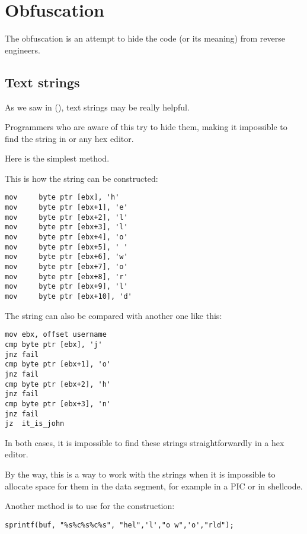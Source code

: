 \section{Obfuscation}

The obfuscation is an attempt to hide the code (or its meaning) from reverse engineers.

\subsection{Text strings}

As we saw in (), text strings may be really helpful.

Programmers who are aware of this try to hide them, making it impossible to find the string in \IDA{} or any hex editor.

Here is the simplest method.

This is how the string can be constructed:

\begin{lstlisting}
mov     byte ptr [ebx], 'h'
mov     byte ptr [ebx+1], 'e'
mov     byte ptr [ebx+2], 'l'
mov     byte ptr [ebx+3], 'l'
mov     byte ptr [ebx+4], 'o'
mov     byte ptr [ebx+5], ' '
mov     byte ptr [ebx+6], 'w'
mov     byte ptr [ebx+7], 'o'
mov     byte ptr [ebx+8], 'r'
mov     byte ptr [ebx+9], 'l'
mov     byte ptr [ebx+10], 'd'
\end{lstlisting}

The string can also be compared with another one like this:

\begin{lstlisting}
mov	ebx, offset username
cmp	byte ptr [ebx], 'j'
jnz	fail
cmp	byte ptr [ebx+1], 'o'
jnz	fail
cmp	byte ptr [ebx+2], 'h'
jnz	fail
cmp	byte ptr [ebx+3], 'n'
jnz	fail
jz	it_is_john
\end{lstlisting}

In both cases, it is impossible to find these strings straightforwardly in a hex editor.


By the way, this is a way to work with the strings when it is impossible
to allocate space for them in the data segment, for example in a \ac{PIC} or in shellcode.

Another method is to use  
for the construction:

\begin{lstlisting}
sprintf(buf, "%s%c%s%c%s", "hel",'l',"o w",'o',"rld");
\end{lstlisting}

